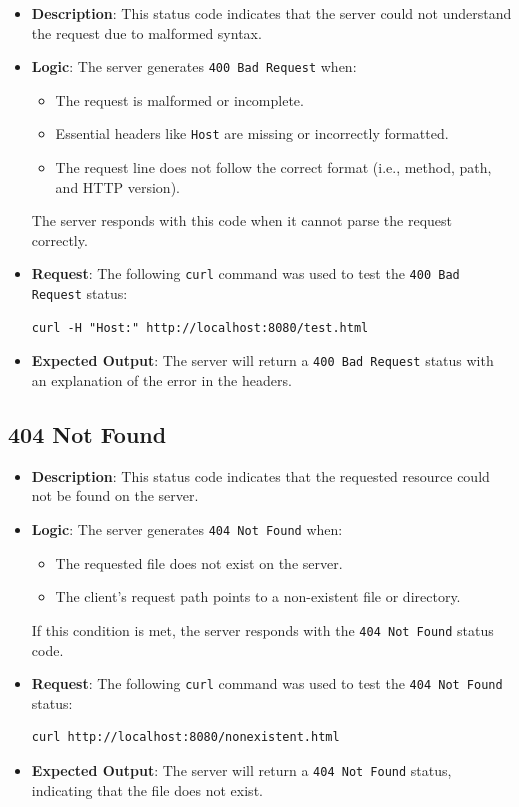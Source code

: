 \documentclass{article}
\begin{document}
\begin{itemize}
    \item \textbf{Description}: This status code indicates that the server could not understand the request due to malformed syntax.
    \item \textbf{Logic}: 
    The server generates \texttt{400 Bad Request} when:
    \begin{itemize}
        \item The request is malformed or incomplete.
        \item Essential headers like \texttt{Host} are missing or incorrectly formatted.
        \item The request line does not follow the correct format (i.e., method, path, and HTTP version).
    \end{itemize}
    The server responds with this code when it cannot parse the request correctly.
    \item \textbf{Request}: The following \texttt{curl} command was used to test the \texttt{400 Bad Request} status:
\begin{lstlisting}
curl -H "Host:" http://localhost:8080/test.html
\end{lstlisting}
    \item \textbf{Expected Output}: The server will return a \texttt{400 Bad Request} status with an explanation of the error in the headers.
\end{itemize}

\subsection*{404 Not Found}

\begin{itemize}
    \item \textbf{Description}: This status code indicates that the requested resource could not be found on the server.
    \item \textbf{Logic}: 
    The server generates \texttt{404 Not Found} when:
    \begin{itemize}
        \item The requested file does not exist on the server.
        \item The client’s request path points to a non-existent file or directory.
    \end{itemize}
    If this condition is met, the server responds with the \texttt{404 Not Found} status code.
    \item \textbf{Request}: The following \texttt{curl} command was used to test the \texttt{404 Not Found} status:
\begin{lstlisting}
curl http://localhost:8080/nonexistent.html
\end{lstlisting}
    \item \textbf{Expected Output}: The server will return a \texttt{404 Not Found} status, indicating that the file does not exist.
\end{itemize}
\end{document}
